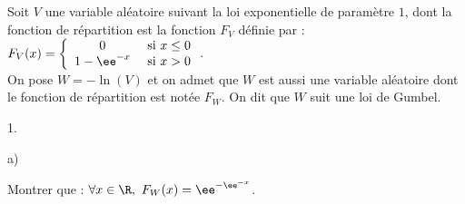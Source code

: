 \documentclass[11pt]{article}%
\begin{document}
\noindent
Soit $V$ une variable aléatoire suivant la loi exponentielle de
paramètre $1$, dont la fonction de répartition est la fonction $F_{V}$
définie par : $F_{V}(x) = \left\{
  \begin{array}{cl}
    0 & \hbox{ si } x \leq 0\\
    1-\ee^{-x} & \hbox{ si } x>0
  \end{array}
\right.$.\\
On pose $W = -\ln(V)$ et on admet que $W$ est aussi une variable
aléatoire dont le fonction de répartition est notée $F_{W}$. On dit
que $W$ suit une loi de Gumbel.
\begin{noliste}{1.}
  \setlength{\itemsep}{4mm}
\item
  \begin{noliste}{a)}
    \setlength{\itemsep}{2mm}
  \item Montrer que : $\forall x \in \R, \ F_{W}(x) =
    \ee^{-\ee^{-x}}$.
    

\end{noliste}
\end{noliste}
\end{document}
